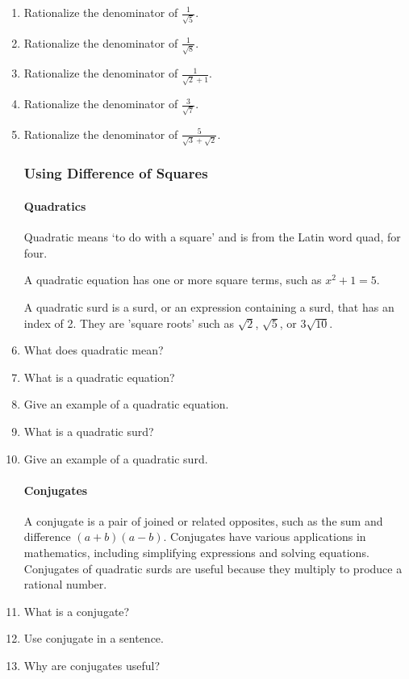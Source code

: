 \documentclass{article}
\begin{document}
\begin{enumerate}
\item Rationalize the denominator of $\frac{1}{\sqrt{5}}$.
\item Rationalize the denominator of $\frac{1}{\sqrt{8}}$.
\item Rationalize the denominator of $\frac{1}{\sqrt{2}+1}$.
\item Rationalize the denominator of $\frac{3}{\sqrt{7}}$.
\item Rationalize the denominator of $\frac{5}{\sqrt{3}+\sqrt{2}}$.

\subsubsection*{Using Difference of Squares}

\paragraph{Quadratics}
Quadratic means ‘to do with a square’ and is from the Latin word quad, for four.

A quadratic equation has one or more square terms, such as $x^2+1=5$.

A quadratic surd is a surd, or an expression containing a surd, that has an index of 2. They are 'square roots’ such as $\sqrt{2}$, $\sqrt{5}$, or $3\sqrt{10}$.

\item What does quadratic mean?
\item What is a quadratic equation?
\item Give an example of a quadratic equation.
\item What is a quadratic surd?
\item Give an example of a quadratic surd.

\paragraph{Conjugates}
A conjugate is a pair of joined or related opposites, such as the sum and difference $(a+b)(a-b)$. Conjugates have various applications in mathematics, including simplifying expressions and solving equations. Conjugates of quadratic surds are useful because they multiply to produce a rational number.

\item What is a conjugate?
\item Use conjugate in a sentence.
\item Why are conjugates useful?


\end{enumerate}
\end{document}
